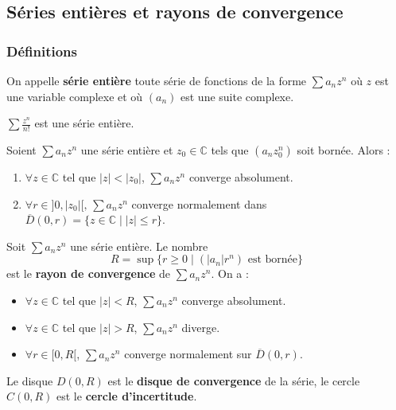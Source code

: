




  \subsection{Séries entières et rayons de convergence}

  \subsubsection{Définitions}


  \begin{definition}
    On appelle \textbf{série entière} toute série de fonctions de la forme $\sum a_n z^n$ où $z$ est une variable complexe et où $(a_n)$ est une suite complexe.
  \end{definition}

  \begin{example}
    $\sum \frac{z^n}{n!}$ est une série entière.
  \end{example}

  \begin{lemma}[Abel]
    Soient $\sum a_n z^n$ une série entière et $z_0 \in \mathbb{C}$ tels que $(a_n z_0^n)$ soit bornée. Alors :
    \begin{enumerate}[label=(\roman*)]
      \item $\forall z \in \mathbb{C}$ tel que $|z| < |z_0|$, $\sum a_n z^n$ converge absolument.
      \item $\forall r \in ]0,|z_0|[, \, \sum a_n z^n$ converge normalement dans $\overline{D}(0, r) = \{ z \in \mathbb{C} \mid |z| \leq r \}$.
    \end{enumerate}
  \end{lemma}

  \begin{definition}
    Soit $\sum a_n z^n$ une série entière. Le nombre
    \[ R = \sup \{ r \geq 0 \mid (|a_n|r^n) \text{ est bornée} \} \]
    est le \textbf{rayon de convergence} de $\sum a_n z^n$. On a :
    \begin{itemize}
      \item $\forall z \in \mathbb{C}$ tel que $|z| < R$, $\sum a_n z^n$ converge absolument.
      \item $\forall z \in \mathbb{C}$ tel que $|z| > R$, $\sum a_n z^n$ diverge.
      \item $\forall r \in [0,R[$, $\sum a_n z^n$ converge normalement sur $\overline{D}(0,r)$.
    \end{itemize}
    Le disque $D(0,R)$ est le \textbf{disque de convergence} de la série, le cercle $C(0,R)$ est le \textbf{cercle d'incertitude}.
  \end{definition}

